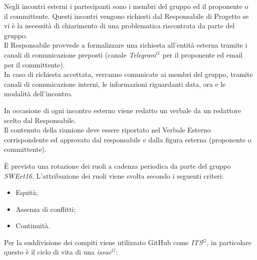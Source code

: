 
            Negli incontri esterni i partecipanti sono i membri del gruppo ed il proponente o il committente.
            Questi incontri vengono richiesti dal Responsabile di Progetto se vi è la necessità di chiarimento di una problematica riscontrata da parte del gruppo. \\
            Il Responsabile provvede a formalizzare una richiesta all'entità esterna tramite i canali di comunicazione preposti (canale \emph{Telegram}$^{G}$ per il proponente ed email per il committente).\\

            In caso di richiesta accettata, verranno comunicate ai membri del gruppo, tramite canali di comunicazione interni, le informazioni riguardanti data, ora e le modalità dell'incontro.

            In occasione di ogni incontro esterno viene redatto un verbale da un redattore scelto dal Responsabile. \\
            Il contenuto della riunione deve essere riportato nel Verbale Esterno corrispondente ed approvato dal responsabile e dalla figura esterna (proponente o committente).


        È prevista una rotazione dei ruoli a cadenza periodica da parte del gruppo \textit{SWEet16}.
        L'attribuzione dei ruoli viene svolta secondo i seguenti criteri:
        \begin{itemize}
            \item Equità;
            \item Assenza di conflitti;
            \item Continuità.
        \end{itemize}


        Per la suddivisione dei compiti viene utilizzato GitHub come \emph{ITS}$^{G}$, in particolare questo è il ciclo di vita di una \emph{issue}$^{G}$:

